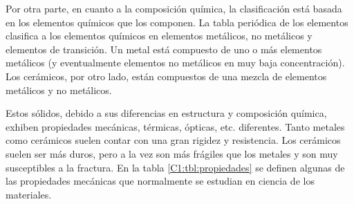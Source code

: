 Por otra parte, en cuanto a la composición química, la clasificación está basada en los elementos químicos que los componen. La tabla periódica de los elementos clasifica a los elementos químicos en elementos metálicos, no metálicos y elementos de transición. Un metal está compuesto de uno o más elementos metálicos (y eventualmente elementos no metálicos en muy baja concentración). Los cerámicos, por otro lado, están compuestos de una mezcla de elementos metálicos y no metálicos. 

Estos sólidos, debido a sus diferencias en estructura y composición química, exhiben propiedades mecánicas, térmicas, ópticas, etc. diferentes. Tanto metales como cerámicos suelen contar con una gran rigidez y resistencia. Los cerámicos suelen ser más duros, pero a la vez son más frágiles que los metales y son muy susceptibles a la fractura. En la tabla \ref{C1:tbl:propiedades} se definen algunas de las propiedades mecánicas que normalmente se estudian en ciencia de los materiales.

